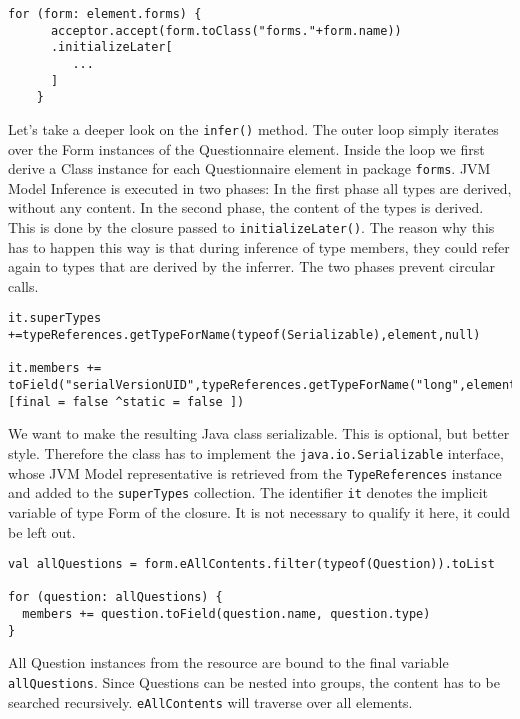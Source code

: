 \begin{lstlisting}[language=Xtend]
    for (form: element.forms) {
      acceptor.accept(form.toClass("forms."+form.name))
      .initializeLater[
         ...
      ]
    }
\end{lstlisting}

Let's take a deeper look on the \texttt{infer()} method. The outer loop simply iterates over the Form instances of the Questionnaire element. Inside the loop we first derive a Class
instance for each Questionnaire element in package \texttt{forms}. JVM Model Inference is executed in two
phases: In the first phase all types are derived, without any content. In the
second phase, the content of the types is derived. This is done by the closure
passed to \texttt{initializeLater()}. The reason why this has to happen this way is that
during inference of type members, they could refer again to types that are
derived by the inferrer. The two phases prevent circular calls.

\begin{lstlisting}[language=Xtend]
it.superTypes +=typeReferences.getTypeForName(typeof(Serializable),element,null)

it.members += toField("serialVersionUID",typeReferences.getTypeForName("long",element),[final = false ^static = false ])
\end{lstlisting}
        
We want to make the resulting Java class serializable. This is optional, but
better style. Therefore the class has to implement the \texttt{java.io.Serializable}
interface, whose JVM Model representative is retrieved from the \texttt{TypeReferences}
instance and added to the \texttt{superTypes} collection. The identifier \texttt{it} denotes the
implicit variable of type Form of the closure. It is not necessary to qualify it
here, it could be left out.

\begin{lstlisting}[language=Xtend]
val allQuestions = form.eAllContents.filter(typeof(Question)).toList

for (question: allQuestions) {
  members += question.toField(question.name, question.type)
}
\end{lstlisting}

All Question instances from the resource are bound to the final variable
\texttt{allQuestions}. Since Questions can be nested into groups, the content has to be
searched recursively. \texttt{eAllContents} will traverse over all elements.

